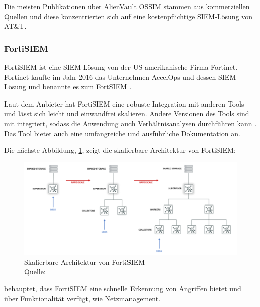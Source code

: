 
Die meisten Publikationen über AlienVault OSSIM stammen aus kommerziellen Quellen und diese konzentrierten sich auf eine kostenpflichtige \gls{SIEM}-Lösung von AT\&T.

\subsubsection{FortiSIEM}
FortiSIEM ist eine \gls{SIEM}-Lösung von der US-amerikanische Firma Fortinet. Fortinet kaufte im Jahr 2016 das Unternehmen AccelOps und dessen \gls{SIEM}-Lösung und benannte es zum FortSIEM \citep{Fortinet_Press}. 

Laut dem Anbieter hat FortiSIEM eine robuste Integration mit anderen Tools und lässt sich leicht und einwandfrei skalieren. Andere Versionen des Tools sind mit  integriert, sodass die Anwendung auch Verhältnisanalysen durchführen kann \citep{Fortinet_Solutions}. Das Tool bietet auch eine umfangreiche und ausführliche Dokumentation an. 

Die nächste Abbildung, \ref{fig:FortiSIEM}, zeigt die skalierbare Architektur von FortiSIEM:

\begin{figure}[H]
   \centering
   \includegraphics[width=1\textwidth]{assets/2_p7.png}
   \caption[Skalierbare Architektur von FortiSIEM]
   {Skalierbare Architektur von FortiSIEM \\Quelle: \citep{Fortinet_Arch} }
   \label{fig:FortiSIEM}
   \centering
\end{figure}


\newpage 
\citep{Ramires_fortisiem} behauptet, dass FortiSIEM eine schnelle Erkennung von Angriffen bietet und über  Funktionalität verfügt, wie Netzmanagement. 

